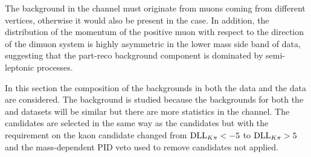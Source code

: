 The background in the \Lbpi channel must originate from muons coming from different vertices, otherwise it would also be present in the \Lbpijpsi case. In addition, the distribution of the momentum of the positive muon with respect to the direction of the dimuon system is highly asymmetric in the lower mass side band of \Lbpi data, suggesting that the part-reco background component is dominated by semi-leptonic processes. %

In this section the composition of the backgrounds in both the \Lbpi data and the \LbK data are considered. The \LbK background is studied because the backgrounds for both the \Lbpi and \LbK datasets will be similar but there are more statistics in the \LbK channel. The \LbK candidates are selected in the same way as the \Lbpi candidates but with the \dllkpi requirement on the kaon candidate changed from $\mathrm{DLL}_{{K}{\pi}}<-5$ to $\mathrm{DLL}_{{K}{\pi}}>5$ and the mass-dependent PID veto used to remove \LbK candidates not applied. %






